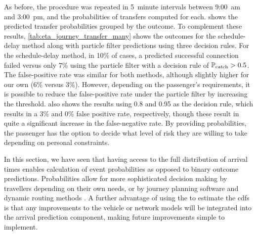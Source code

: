 As before, the procedure was repeated in 5~minute intervals between  9:00~am and  3:00~pm, and the probabilities of transfers computed for each.  shows the predicted transfer probabilities grouped by the outcome. To complement these results, \cref{tab:eta_journey_transfer_many} shows the outcomes for the schedule-delay method along with particle filter predictions using three decision rules. For the schedule-delay method, in 10\% of cases, a predicted successful connection failed versus only 7\% using the particle filter with a decision rule of $\mathbb{P}_\text{catch} > 0.5$. The false-positive rate was similar for both methods, although slightly higher for our own (6\% versus 3\%). However, depending on the passenger's requirements, it is possible to reduce the false-positive rate under the particle filter by increasing the threshold.    also shows the results using 0.8 and 0.95 as the decision rule, which results in a 3\% and 0\% false positive rate, respectively, though these result in quite a significant increase in the false-negative rate. By providing probabilities, the passenger has the option to decide what level of risk they are willing to take depending on personal constraints.


In this section, we have seen that having access to the full distribution of arrival times enables calculation of event probabilities as opposed to binary outcome predictions. Probabilities allow for more sophisticated decision making by travellers depending on their own needs, or by journey planning software and dynamic routing methods \citep{Berczi_2017}. A further advantage of using the \pf{} to estimate the \glspl{cdf} is that any improvements to the vehicle or network models will be integrated into the arrival prediction component, making future improvements simple to implement.
